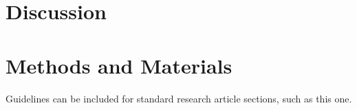 \documentclass[9pt,lineno]{elife}
\begin{document}






\section{Discussion}

\lipsum[9]

\section{Methods and Materials}

Guidelines can be included for standard research article sections, such as this one. 
\end{document}

